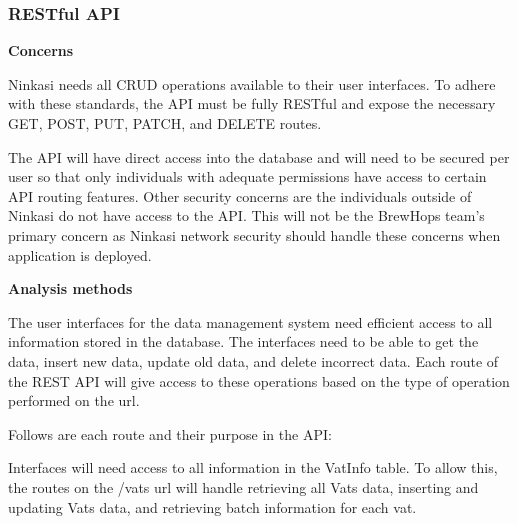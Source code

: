 \documentclass[draftclsnofoot,onecolumn,letterpaper,10pt]{IEEEtran}
\begin{document}
		\subsubsection{RESTful API}
			\textbf{Concerns}

			Ninkasi needs all CRUD operations available to their user interfaces. To adhere with these standards, the API must be fully RESTful and expose the necessary GET, POST, PUT, PATCH, and DELETE routes.

			The API will have direct access into the database and will need to be secured per user so that only individuals with adequate permissions have access to certain API routing features. Other security concerns are the individuals outside of Ninkasi do not have access to the API. This will not be the BrewHops team’s primary concern as Ninkasi network security should handle these concerns when application is deployed.

			\textbf{Analysis methods}

			The user interfaces for the data management system need efficient access to all information stored in the database. The interfaces need to be able to get the data, insert new data, update old data, and delete incorrect data. Each route of the REST API will give access to these operations based on the type of operation performed on the url.

			Follows are each route and their purpose in the API:

			Interfaces will need access to all information in the VatInfo table. To allow this, the routes on the /vats url will handle retrieving all Vats data, inserting and updating Vats data, and retrieving batch information for each vat.
\end{document}

